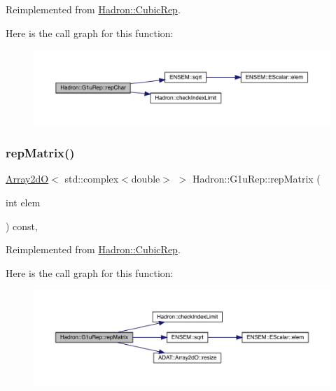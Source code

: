 Reimplemented from \mbox{\hyperlink{structHadron_1_1CubicRep_af45227106e8e715e84b0af69cd3b36f8}{Hadron\+::\+Cubic\+Rep}}.

Here is the call graph for this function\+:
\nopagebreak
\begin{figure}[H]
\begin{center}
\leavevmode
\includegraphics[width=350pt]{d8/d42/structHadron_1_1G1uRep_a3d37407f93af4c955c024aafa0948bcb_cgraph}
\end{center}
\end{figure}
\mbox{\label{structHadron_1_1G1uRep_a0f295ec0cd03014d647fa952f2c67676}} 
\subsubsection{\texorpdfstring{repMatrix()}{repMatrix()}\hspace{0.1cm}{\footnotesize\ttfamily [1/3]}}
{\footnotesize\ttfamily \mbox{\hyperlink{classADAT_1_1Array2dO}{Array2dO}}$<$ std\+::complex$<$double$>$ $>$ Hadron\+::\+G1u\+Rep\+::rep\+Matrix (\begin{DoxyParamCaption}\item[{int}]{elem }\end{DoxyParamCaption}) const\hspace{0.3cm}{\ttfamily [inline]}, {\ttfamily [virtual]}}



Reimplemented from \mbox{\hyperlink{structHadron_1_1CubicRep_ac5d7e9e6f4ab1158b5fce3e4ad9e8005}{Hadron\+::\+Cubic\+Rep}}.

Here is the call graph for this function\+:
\nopagebreak
\begin{figure}[H]
\begin{center}
\leavevmode
\includegraphics[width=350pt]{d8/d42/structHadron_1_1G1uRep_a0f295ec0cd03014d647fa952f2c67676_cgraph}
\end{center}
\end{figure}
\mbox{\label{structHadron_1_1G1uRep_a0f295ec0cd03014d647fa952f2c67676}} 
